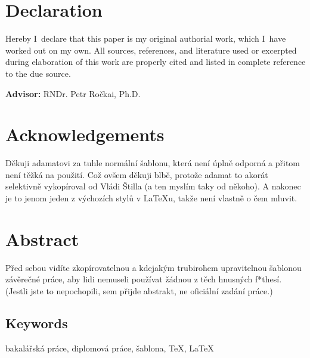 \section*{Declaration} Hereby I~declare that this paper is my original authorial work, which
I~have worked out on my own. All sources, references, and literature
used or excerpted during elaboration of this work are properly cited
and listed in complete reference to the due source.

\vfill\noindent
\textbf{Advisor:} RNDr. Petr Ročkai, Ph.D.   %
\cleardoublepage

\section*{Acknowledgements} %
Děkuji adamatovi za tuhle normální šablonu, která není úplně odporná a přitom
není těžká na použití. Což ovšem děkuji blbě, protože adamat to akorát
selektivně vykopíroval od Vládi Štilla (a ten myslím taky od někoho). A nakonec
je to jenom jeden z výchozích stylů v \LaTeX u, takže není vlastně o čem mluvit.
\cleardoublepage

\section*{Abstract} %
Před sebou vidíte zkopírovatelnou a kdejakým trubirohem upravitelnou šablonou
závěrečné práce, aby lidi nemuseli používat žádnou z těch hnusných f*thesí.
(Jestli jste to nepochopili, sem přijde abstrakt, ne oficiální zadání práce.)

\subsection*{Keywords} %
bakalářská práce, diplomová práce, šablona, \TeX, \LaTeX
\cleardoublepage
